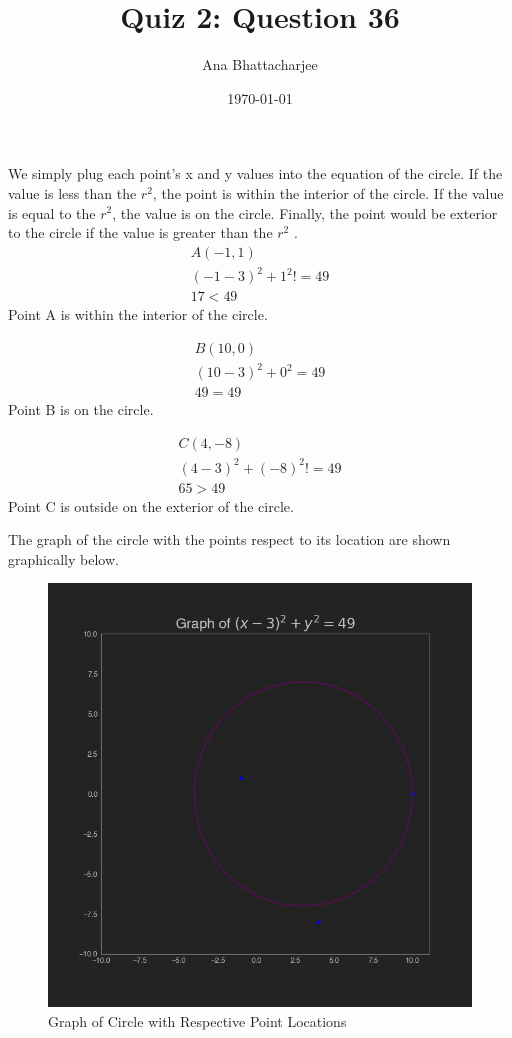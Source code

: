 \documentclass{article}
\begin{document}
\author{Ana Bhattacharjee}
\title{Quiz 2: Question 36}
\date{\today}
\maketitle{}

\begin{center}
We simply plug each point's x and y values into the equation of the circle. If the value is less than the $r^2$, the point is within the interior of the circle. If the value is equal to the $r^2$, the value is on the circle. Finally, the point would be exterior to the circle if the value is greater than the $r^2$ .
\begin{align}
A (-1, 1) \\
(-1 - 3)^2 + 1^2 != 49 \\
17 < 49
\end{align}
Point A is within the interior of the circle.
\par
\begin{align}
B (10, 0) \\
(10 - 3)^2 + 0^2 = 49 \\
49 = 49
\end{align}
Point B is on the circle.
\par
\begin{align}
C (4, -8) \\
(4 - 3)^2 + (-8)^2 != 49 \\
65 > 49
\end{align}
Point C is outside on the exterior of the circle.
\par
The graph of the circle with the points respect to its location are shown graphically below.
\begin{figure}[!htbp]
  \includegraphics[width=1.0\columnwidth]{../q36/circle.png}
  \caption{Graph of Circle with Respective Point Locations}
\end{figure}
\end{center}
\end{document}
